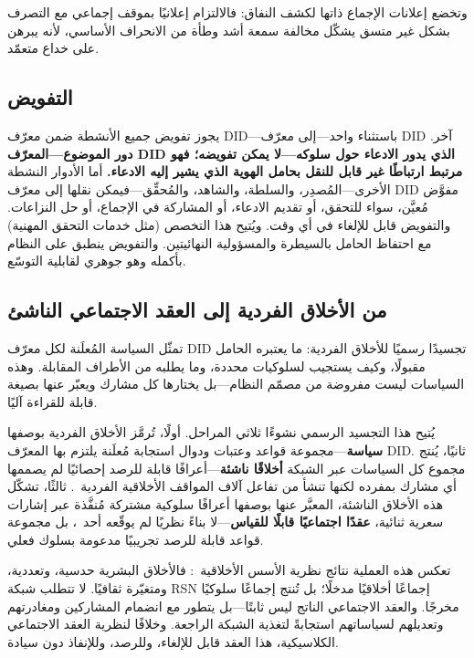 \documentclass[11pt,a4paper,twocolumn]{article}
\begin{document}
وتخضع إعلانات الإجماع ذاتها لكشف النفاق: فالالتزام إعلانيًا بموقف إجماعي مع التصرف بشكل غير متسق يشكّل مخالفة سمعة أشد وطأة من الانحراف الأساسي، لأنه يبرهن على خداع متعمّد.

\subsection{التفويض}

يجوز تفويض جميع الأنشطة ضمن معرّف DID---باستثناء واحد---إلى معرّف DID آخر. \textbf{دور الموضوع---المعرّف DID الذي يدور الادعاء حول سلوكه---لا يمكن تفويضه؛ فهو مرتبط ارتباطًا غير قابل للنقل بحامل الهوية الذي يشير إليه الادعاء.} أما الأدوار النشطة الأخرى---المُصدِر، والسلطة، والشاهد، والمُحقِّق---فيمكن نقلها إلى معرّف DID مفوَّض مُعيَّن، سواء للتحقق، أو تقديم الادعاء، أو المشاركة في الإجماع، أو حل النزاعات. والتفويض قابل للإلغاء في أي وقت. ويُتيح هذا التخصص (مثل خدمات التحقق المهنية) مع احتفاظ الحامل بالسيطرة والمسؤولية النهائيتين. والتفويض ينطبق على النظام بأكمله وهو جوهري لقابلية التوسّع.

\subsection{من الأخلاق الفردية إلى العقد الاجتماعي الناشئ}

تمثّل السياسة المُعلَنة لكل معرّف DID تجسيدًا رسميًا للأخلاق الفردية: ما يعتبره الحامل مقبولًا، وكيف يستجيب لسلوكيات محددة، وما يطلبه من الأطراف المقابلة. وهذه السياسات ليست مفروضة من مصمّم النظام---بل يختارها كل مشارك ويعبّر عنها بصيغة قابلة للقراءة آليًا.

يُتيح هذا التجسيد الرسمي نشوءًا ثلاثي المراحل. أولًا، تُرمَّز الأخلاق الفردية بوصفها \textbf{سياسة}---مجموعة قواعد وعتبات ودوال استجابة مُعلَنة يلتزم بها المعرّف DID. ثانيًا، يُنتج مجموع كل السياسات عبر الشبكة \textbf{أخلاقًا ناشئة}---أعرافًا قابلة للرصد إحصائيًا لم يصممها أي مشارك بمفرده لكنها تنشأ من تفاعل آلاف المواقف الأخلاقية الفردية~\cite{durkheim1893}. ثالثًا، تشكّل هذه الأخلاق الناشئة، المعبَّر عنها بوصفها أعرافًا سلوكية مشتركة مُنفَّذة عبر إشارات سعرية ثنائية، \textbf{عقدًا اجتماعيًا قابلًا للقياس}---لا بناءً نظريًا لم يوقّعه أحد~\cite{rawls1971}، بل مجموعة قواعد قابلة للرصد تجريبيًا مدعومة بسلوك فعلي.

تعكس هذه العملية نتائج نظرية الأسس الأخلاقية~\cite{haidt2012}: فالأخلاق البشرية حدسية، وتعددية، ومتغيّرة ثقافيًا. لا تتطلب شبكة RSN إجماعًا أخلاقيًا مدخلًا؛ بل تُنتج إجماعًا سلوكيًا مخرجًا. والعقد الاجتماعي الناتج ليس ثابتًا---بل يتطور مع انضمام المشاركين ومغادرتهم وتعديلهم لسياساتهم استجابةً لتغذية الشبكة الراجعة. وخلافًا لنظرية العقد الاجتماعي الكلاسيكية، هذا العقد قابل للإلغاء، وللرصد، وللإنفاذ دون سيادة.
\end{document}
